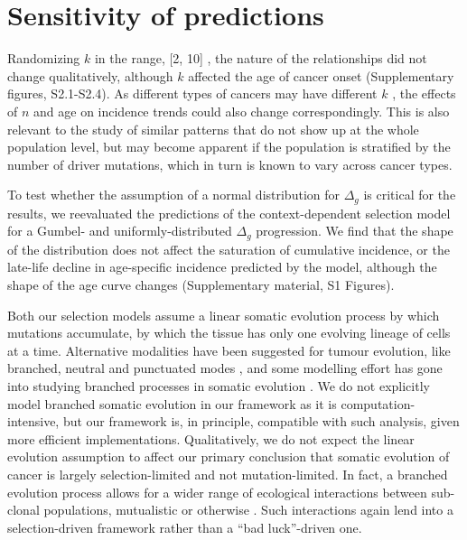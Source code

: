 \documentclass[12pt,onecolumn,twoside]{article}
\begin{document}
\section{Sensitivity of predictions}

Randomizing $k$ in the range, [2, 10] \autocite{Martincorena2017}, the nature of the relationships did not change qualitatively, although $k$ affected the age of cancer onset (Supplementary figures, S2.1-S2.4). As different types of cancers may have different $k$ \autocite{Nunney2015}, the effects of $n$ and age on incidence trends could also change correspondingly. This is also relevant to the study of similar patterns that do not show up at the whole population level, but may become apparent if the population is stratified by the number of driver mutations, which in turn is known to vary across cancer types.

To test whether the assumption of a normal distribution for $\Delta_{g}$ is critical for the results, we reevaluated the predictions of the context-dependent selection model for a Gumbel- and uniformly-distributed $\Delta_{g}$ progression. We find that the shape of the distribution does not affect the saturation of cumulative incidence, or the late-life decline in age-specific incidence predicted by the model, although the shape of the age curve changes (Supplementary material, S1 Figures).

Both our selection models assume a linear somatic evolution process by which mutations accumulate, by which the tissue has only one evolving lineage of cells at a time. Alternative modalities have been suggested for tumour evolution, like branched, neutral and punctuated modes \autocite{Davis2017a}, and some modelling effort has gone into studying branched processes in somatic evolution \autocite{Chowell2018}. We do not explicitly model branched somatic evolution in our framework as it is computation-intensive, but our framework is, in principle, compatible with such analysis, given more efficient implementations. Qualitatively, we do not expect the linear evolution assumption to affect our primary conclusion that somatic evolution of cancer is largely selection-limited and not mutation-limited. In fact, a branched evolution process allows for a wider range of ecological interactions between sub-clonal populations, mutualistic or otherwise \autocite{Aktipis2013, Kareva2011}. Such interactions again lend into a selection-driven framework rather than a ``bad luck''-driven one.
\end{document}
